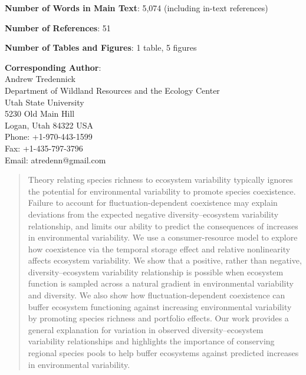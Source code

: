 \documentclass[12pt,]{article}
\begin{document}
\begin{singlespace}
\noindent \textbf{Number of Words in Main Text}: 5,074 (including in-text references)

\noindent \textbf{Number of References}: 51

\noindent \textbf{Number of Tables and Figures}: 1 table, 5 figures

\noindent \textbf{Corresponding Author}:  \\
\phantom{222}Andrew Tredennick  \\
\phantom{222}Department of Wildland Resources and the Ecology Center  \\
\phantom{222}Utah State University  \\
\phantom{222}5230 Old Main Hill  \\
\phantom{222}Logan, Utah 84322 USA  \\
\phantom{222}Phone: +1-970-443-1599  \\
\phantom{222}Fax: +1-435-797-3796  \\
\phantom{222}Email: atredenn@gmail.com

\end{singlespace}

\newpage{}

\begin{abstract}
Theory relating species richness to ecosystem variability typically ignores the potential for environmental variability to promote species coexistence.
Failure to account for fluctuation-dependent coexistence may explain deviations from the expected negative diversity--ecosystem variability relationship, and limits our ability to predict the consequences of increases in environmental variability.
We use a consumer-resource model to explore how coexistence via the temporal storage effect and relative nonlinearity affects ecosystem variability.
We show that a positive, rather than negative, diversity--ecosystem variability relationship is possible when ecosystem function is sampled across a natural gradient in environmental variability and diversity.
We also show how fluctuation-dependent coexistence can buffer ecosystem functioning against increasing environmental variability by promoting species richness and portfolio effects.
Our work provides a general explanation for variation in observed diversity--ecosystem variability relationships and highlights the importance of conserving regional species pools to help buffer ecosystems against predicted increases in environmental variability.
\vspace{2em}
\end{abstract}
\end{document}
